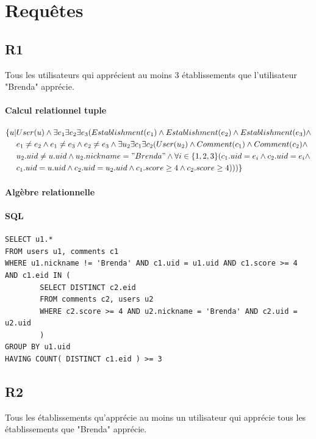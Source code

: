 \documentclass[11pt,a4paper]{report}
\begin{document}
\section*{Requêtes}
\subsection*{R1}
\noindent Tous les utilisateurs qui apprécient au moins 3 établissements que l'utilisateur "Brenda" apprécie.
\paragraph*{Calcul relationnel tuple}
\begin{align*}
\{ u | & User(u) \wedge \exists e_{1} \exists e_{2} \exists e_{3} ( Establishment(e_{1}) \wedge
Establishment(e_{2}) \wedge Establishment(e_{3}) \wedge \\ 
& e_{1} \neq e_{2} \wedge e_{1} \neq e_{3} \wedge e_{2} \neq e_{3} \wedge \exists u_{2} \exists c_{1} \exists c_{2} ( User(u_{2}) \wedge Comment(c_{1}) \wedge Comment(c_{2}) \wedge \\
& u_{2}.uid \neq u.uid \wedge u_{2}.nickname = "Brenda" \wedge \forall i \in \{1,2,3 \}(c_{1}.uid=e_{i} \wedge c_{2}.uid=e_{i} \wedge  \\
& c_{1}.uid = u.uid \wedge c_{2}.uid = u_{2}.uid \wedge  c_{1}.score \geq 4 \wedge  c_{2}.score \geq 4  )))
\}
\end{align*}
\paragraph*{Algèbre relationnelle}
\paragraph*{SQL}
\begin{verbatim}
SELECT u1.*
FROM users u1, comments c1
WHERE u1.nickname != 'Brenda' AND c1.uid = u1.uid AND c1.score >= 4 AND c1.eid IN (
        SELECT DISTINCT c2.eid
        FROM comments c2, users u2
        WHERE c2.score >= 4 AND u2.nickname = 'Brenda' AND c2.uid = u2.uid
        )
GROUP BY u1.uid
HAVING COUNT( DISTINCT c1.eid ) >= 3
\end{verbatim}
\subsection*{R2}
\noindent Tous les établissements qu’apprécie au moins un utilisateur qui apprécie tous les établissements que "Brenda" apprécie.
\end{document}
